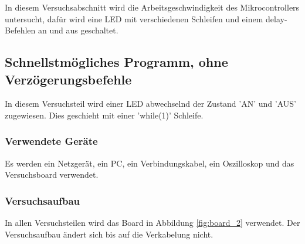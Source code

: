 \documentclass[12pt,a4paper]{article}
\begin{document}
In diesem Versuchsabschnitt wird die Arbeitsgeschwindigkeit des Mikrocontrollers untersucht, dafür wird eine LED mit verschiedenen Schleifen und einem delay-Befehlen an und aus geschaltet.

\subsection{Schnellstmögliches Programm, ohne Verzögerungsbefehle}

In diesem Versuchsteil wird einer LED abwechselnd der Zustand 'AN' und 'AUS' zugewiesen. Dies geschieht mit einer 'while(1)' Schleife.

\subsubsection*{Verwendete Geräte}

Es werden ein Netzgerät, ein PC, ein Verbindungskabel, ein Oszilloskop und das Versuchsboard verwendet.

\subsubsection*{Versuchsaufbau}

In allen Versuchsteilen wird das Board in Abbildung \ref{fig:board_2} verwendet. Der Versuchsaufbau ändert sich bis auf die Verkabelung nicht.
\end{document}
